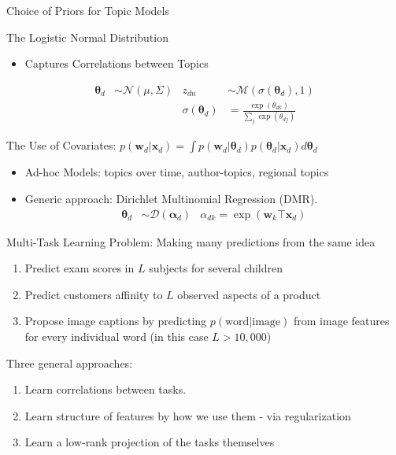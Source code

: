 \documentclass[xcolor=dvipsnames]{beamer}
\newcommand \vv[1] { \boldsymbol #1 }
\newcommand \wdoc      { { \vv{w}_d } }
\newcommand \thd[0]  { { \vv \theta_d } }
\newcommand \xd      { { \vv x_d } }
\newcommand \nor[2]   { \mathcal{N} \left( {#1}, {#2} \right) }
\newcommand \muln[2]  { \mathcal{M} \left( {#1},{#2} \right) }
\newcommand \dir[1]   { \mathcal{D} \left( {#1} \right) }
\newcommand \dir[1]   { \mathcal{D} \left( {#1} \right) }
\begin{document}


\begin{frame}{Choice of Priors for Topic Models}
 { 
    The Logistic Normal Distribution
    \begin{itemize}
            \item Captures Correlations between Topics\cite{Blei2006}
        \end{itemize}

        \begin{align*}
        \vv{\theta}_d & \sim \nor{\mu}{\Sigma} & z_{dn} &\sim \muln{\sigma(\vv{\theta}_d)}{1}\\
        & & \sigma(\vv{\theta}_d) & = \frac{\exp(\theta_{dk})}{\sum_j \exp(\theta_{dj})} 
        \end{align*}
    }
    
     { 
    The Use of Covariates: $p(\wdoc | \xd) = \int p(\wdoc|\thd) p(\thd|\xd) d\thd$
    \begin{itemize}
        \item Ad-hoc Models: topics over time\cite{Wang2006}, author-topics\cite{MacCallum2007}, regional topics\cite{Eisenstein2010}
        \item Generic approach: Dirichlet Multinomial Regression (DMR)\cite{Mimno2008}.
        \begin{align*}
        \vv{\theta}_d & \sim \dir{\vv{\alpha}_d} & \alpha_{dk} = \exp(\vv{w}_k\top\xd)
        \end{align*}

    \end{itemize} 
    }

\end{frame}




\begin{frame}{Multi-Task Learning}
Problem: Making many predictions from the same idea
\begin{enumerate}
    \item Predict exam scores in $L$ subjects for several children\cite{Bonilla2008}
    \item Predict customers affinity to $L$ observed aspects of a product\cite{Allenby1999}
    \item Propose image captions by predicting $p(\text{word}|\text{image})$ from image features for every individual word (in this case $L > 10,000$)\cite{Archambeau2011}
\end{enumerate}

\medskip 
\pause

Three general approaches:\cite{Caruana1997}
\begin{enumerate}
    \item Learn correlations between tasks.
    \item Learn structure of features by how we use them - via regularization
    \item Learn a low-rank projection of the tasks themselves
\end{enumerate}
\end{frame}
\end{document}
